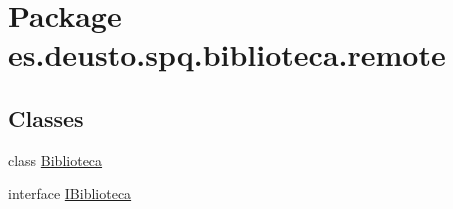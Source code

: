 \hypertarget{namespacees_1_1deusto_1_1spq_1_1biblioteca_1_1remote}{}\section{Package es.\+deusto.\+spq.\+biblioteca.\+remote}
\label{namespacees_1_1deusto_1_1spq_1_1biblioteca_1_1remote}
\subsection*{Classes}
\begin{DoxyCompactItemize}
\item 
class \mbox{\hyperlink{classes_1_1deusto_1_1spq_1_1biblioteca_1_1remote_1_1_biblioteca}{Biblioteca}}
\item 
interface \mbox{\hyperlink{interfacees_1_1deusto_1_1spq_1_1biblioteca_1_1remote_1_1_i_biblioteca}{I\+Biblioteca}}
\end{DoxyCompactItemize}

